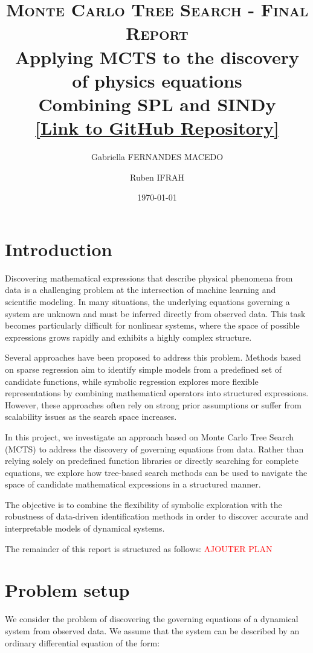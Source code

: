 \documentclass[11pt, a4paper]{article}
\title{
    \textsc{\large Monte Carlo Tree Search - Final Report} \\
    \vspace{0.8cm}
    \textbf{Applying MCTS to the discovery of physics equations}\\
    \large Combining SPL and SINDy\\
    \vspace{1ex}
\normalsize \href{https://github.com/rubenifrah/SONATA-project}{[Link to GitHub Repository]}}
\author[1]{Gabriella FERNANDES MACEDO}
\author[1]{Ruben IFRAH}
\affil[1]{\normalsize Master IASD, Dauphine-PSL}
\date{\today}
\begin{document}
\maketitle

\tableofcontents

\newpage

\section{Introduction}

Discovering mathematical expressions that describe physical phenomena from data is a challenging problem at the intersection of machine learning and scientific modeling. In many situations, the underlying equations governing a system are unknown and must be inferred directly from observed data. This task becomes particularly difficult for nonlinear systems, where the space of possible expressions grows rapidly and exhibits a highly complex structure.

Several approaches have been proposed to address this problem. Methods based on sparse regression aim to identify simple models from a predefined set of candidate functions, while symbolic regression explores more flexible representations by combining mathematical operators into structured expressions. However, these approaches often rely on strong prior assumptions or suffer from scalability issues as the search space increases.

In this project, we investigate an approach based on Monte Carlo Tree Search (MCTS) to address the discovery of governing equations from data. Rather than relying solely on predefined function libraries or directly searching for complete equations, we explore how tree-based search methods can be used to navigate the space of candidate mathematical expressions in a structured manner.

The objective is to combine the flexibility of symbolic exploration with the robustness of data-driven identification methods in order to discover accurate and interpretable models of dynamical systems.

The remainder of this report is structured as follows: \textcolor{red}{AJOUTER PLAN}

\section{Problem setup}

We consider the problem of discovering the governing equations of a dynamical system from observed data. We assume that the system can be described by an ordinary differential equation of the form:
\end{document}

